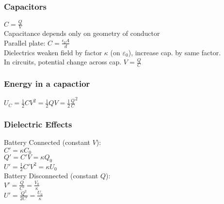 \subsubsection*{Capacitors}
$C = \frac{Q}{V}$\\
Capacitance depends only on geometry of conductor\\
Parallel plate: $C = \frac{\epsilon_0 A}{d}$\\
Dielectrics weaken field by factor $\kappa$ (on $\varepsilon_0$), increase
cap. by same factor.\\
In circuits, potential change across cap. $V = \frac{Q}{C}$
\subsubsection*{Energy in a capactior}
$U_C = \frac{1}{2}CV^2 = \frac{1}{2}QV = \frac{1}{2}\frac{Q}{C}^2$
\subsubsection*{Dielectric Effects}
Battery Connected (constant $V$):\\
$C' = \kappa C_0$\\
$Q' = C'V = \kappa Q_0$\\
$U' = \frac{1}{2}C'V^2 = \kappa U_0$\\
Battery Disconnected (constant $Q$): \\
$V' = \frac{Q}{C'} = \frac{V_0}{\kappa}$\\
$U' = \frac{Q^2}{2C'} = \frac{U_0}{\kappa}$
